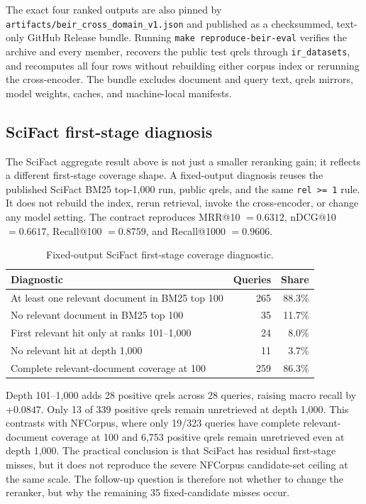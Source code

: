 \documentclass[11pt,a4paper]{article}
\makeatletter
\newcommand{\mrr}{MRR@10}
\newcommand{\ndcg}{nDCG@10}
\newcommand{\recallH}{Recall@100}
\newcommand{\recallK}{Recall@1000}
\newcommand{\bmtwofive}{BM25}
\makeatother
\begin{document}
The exact four ranked outputs are also pinned by
\texttt{artifacts/beir\_cross\_domain\_v1.json} and published as a
checksummed, text-only GitHub Release bundle.  Running
\texttt{make reproduce-beir-eval} verifies the archive and every member,
recovers the public test qrels through \texttt{ir\_datasets}, and recomputes
all four rows without rebuilding either corpus index or rerunning the
cross-encoder.  The bundle excludes document and query text, qrels mirrors,
model weights, caches, and machine-local manifests.

\subsection{SciFact first-stage diagnosis}
\label{sec:scifact-first-stage}

The SciFact aggregate result above is not just a smaller reranking
gain; it reflects a different first-stage coverage shape.  A
fixed-output diagnosis reuses the published SciFact \bmtwofive{}
top-1,000 run, public qrels, and the same \texttt{rel >= 1} rule.  It
does not rebuild the index, rerun retrieval, invoke the cross-encoder,
or change any model setting.  The contract reproduces \mrr{} $=0.6312$,
\ndcg{} $=0.6617$, \recallH{} $=0.8759$, and \recallK{} $=0.9606$.

\begin{table}[H]
  \centering\small
  \caption{Fixed-output SciFact first-stage coverage diagnostic.}
  \label{tab:scifact-first-stage}
  \begin{tabularx}{\linewidth}{Xrr}
    \toprule
    Diagnostic & Queries & Share \\
    \midrule
    At least one relevant document in \bmtwofive{} top 100 & 265 & 88.3\% \\
    No relevant document in \bmtwofive{} top 100 & 35 & 11.7\% \\
    First relevant hit only at ranks 101--1,000 & 24 & 8.0\% \\
    No relevant hit at depth 1,000 & 11 & 3.7\% \\
    Complete relevant-document coverage at 100 & 259 & 86.3\% \\
    \bottomrule
  \end{tabularx}
\end{table}

Depth 101--1,000 adds 28 positive qrels across 28 queries, raising
macro recall by $+0.0847$.  Only 13 of 339 positive qrels remain
unretrieved at depth 1,000.  This contrasts with NFCorpus, where only
19/323 queries have complete relevant-document coverage at 100 and
6,753 positive qrels remain unretrieved even at depth 1,000.  The
practical conclusion is that SciFact has residual first-stage misses,
but it does not reproduce the severe NFCorpus candidate-set ceiling at
the same scale.  The follow-up question is therefore not whether to
change the reranker, but why the remaining 35 fixed-candidate misses
occur.
\end{document}
